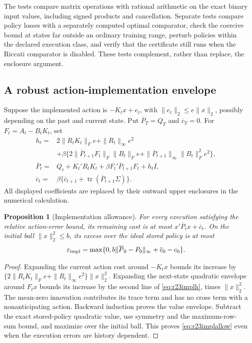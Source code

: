 \documentclass[ecta,nameyear,draft]{econsocart}
\newtheorem{proposition}[theorem]{Proposition}
\theoremstyle{definition}
\theoremstyle{remark}
\newcommand{\tr}{\operatorname{tr}}
\begin{document}
The tests compare matrix operations with rational arithmetic on the exact
binary input values, including signed products and cancellation. Separate
tests compare policy losses with a separately computed optimal comparator,
check the coercive bound at states far outside an ordinary training range,
perturb policies within the declared execution class, and verify that the
certificate still runs when the Riccati comparator is disabled. These tests
complement, rather than replace, the enclosure argument.

\subsection{A robust action-implementation envelope}
Suppose the implemented action is $-K_tx+e_t$, with
$\|e_t\|_2\leq e\|x\|_2$, possibly depending on the past and current state.
Put $\overline P_T=Q_T$ and $\overline c_T=0$. For $F_t=A_t-B_tK_t$, set
\begin{align}
 h_t={}&2\|R_tK_t\|_F e+\|R_t\|_\infty e^2\nonumber\\
 &+\beta\{2\|\overline P_{t+1}F_t\|_F\|B_t\|_F e
             +\|\overline P_{t+1}\|_\infty\|B_t\|_F^2e^2\},
 \label{eq:r23implh}\\
 \overline P_t={}&Q_t+K_t'R_tK_t+
                    \beta F_t'\overline P_{t+1}F_t+h_tI,\nonumber\\
 \overline c_t={}&\beta\{\overline c_{t+1}+\tr(\overline P_{t+1}\Sigma)\}.
 \label{eq:r23implrec}
\end{align}
All displayed coefficients are replaced by their outward upper enclosures
in the numerical calculation.

\begin{proposition}[Implementation allowance]\label{prop:r23implementation}
For every execution satisfying the relative action-error bound, its remaining
cost is at most $x'\overline P_tx+\overline c_t$. On the initial ball
$\|x\|_2^2\leq b$, its excess over the ideal stored policy is at most
\begin{equation}
 \varepsilon_{\rm impl}
 =\max\{0,b\|\overline P_0-P_0\|_\infty+
                         \overline c_0-c_0\}.
 \label{eq:r23implallow}
\end{equation}
\end{proposition}
\begin{proof}
Expanding the current action cost around $-K_tx$ bounds its increase by
$\{2\|R_tK_t\|_F e+\|R_t\|_\infty e^2\}\|x\|_2^2$.
Expanding the next-state quadratic envelope around $F_tx$ bounds its
increase by the second line of \eqref{eq:r23implh}, times $\|x\|_2^2$.
The mean-zero innovation contributes its trace term and has no cross term
with a nonanticipating action. Backward induction proves the value envelope.
Subtract the exact stored-policy quadratic value, use symmetry and the
maximum-row-sum bound, and maximize over the initial ball. This proves
\eqref{eq:r23implallow} even when the execution errors are history dependent.
\end{proof}
\end{document}
